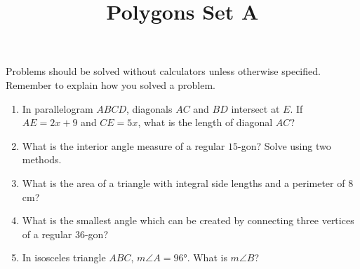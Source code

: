 \documentclass{article}
\title{Polygons Set A}
\author{}
\date{}
\begin{document}
\maketitle
\noindent Problems should be solved without calculators unless otherwise specified.
Remember to explain how you solved a problem.
\begin{multicols}{2}
    \begin{enumerate}
        \item In parallelogram $ABCD$, diagonals $AC$ and $BD$ intersect at $E$.
            If $AE = 2x + 9$ and $CE = 5x$, what is the length of diagonal $AC$?
            \vspace{3cm}
        \item What is the interior angle measure of a regular $15$-gon?
            Solve using two methods.
            \vspace{3cm}
        \item What is the area of a triangle with integral side lengths and a perimeter of $8$ cm?
            \vspace{3cm}
        \item What is the smallest angle which can be created by connecting three vertices of a regular $36$-gon?
            \vspace{3cm}
        \item In isosceles triangle $ABC$, $m\angle A = \ang{96}$.
            What is $m\angle B$?
            \vspace{3cm}
    \end{enumerate}
\end{multicols}
\end{document}
